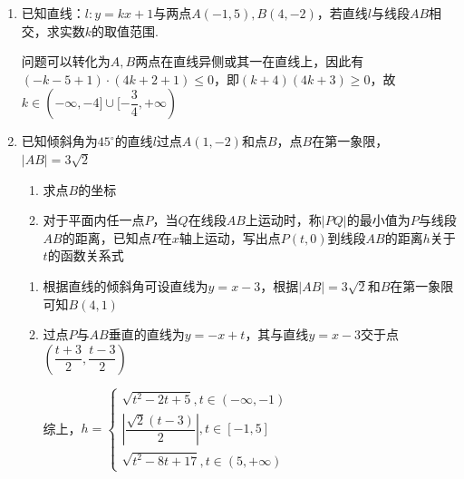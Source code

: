 \begin{enumerate}
\begin{jieda}
    \end{jieda}
    \item 已知直线：$l: y = kx+1$与两点$A(-1, 5), B(4, -2)$，若直线$l$与线段$AB$相交，求实数$k$的取值范围.
    \begin{jieda}
        问题可以转化为$A,B$两点在直线异侧或其一在直线上，因此有$(-k-5+1)\cdot(4k+2+1) \leq 0$，即$(k+4)(4k+3)\geq 0$，故$k \in (-\infty, -4] \cup [-\dfrac{3}{4}, +\infty)$
    \end{jieda}
    \item 已知倾斜角为$45^{\circ}$的直线$l$过点$A(1,-2)$和点$B$，点$B$在第一象限，$|AB| = 3\sqrt{2}$
    \begin{enumerate}
        \item 求点$B$的坐标
        \item 对于平面内任一点$P$，当$Q$在线段$AB$上运动时，称$|PQ|$的最小值为$P$与线段$AB$的距离，已知点$P$在$x$轴上运动，写出点$P(t, 0)$到线段$AB$的距离$h$关于$t$的函数关系式
    \end{enumerate}
    \begin{jieda}
        \begin{enumerate}
            \item 根据直线的倾斜角可设直线为$y = x-3$，根据$|AB| = 3\sqrt{2}$和$B$在第一象限可知$B(4,1)$
            \item 过点$P$与$AB$垂直的直线为$y = -x+t$，其与直线$y = x-3$交于点$\left(\dfrac{t+3}{2}, \dfrac{t-3}{2}\right)$
            综上，$h = \left \{ \begin{array}{l}
                 \sqrt{t^2-2t+5}, t \in (-\infty, -1) \\
                 \left|\dfrac{\sqrt{2}(t-3)}{2}\right|, t \in [-1, 5] \\
                 \sqrt{t^2-8t+17}, t \in (5, +\infty)
            \end{array} \right.$
        \end{enumerate}
    \end{jieda}
\end{enumerate}

